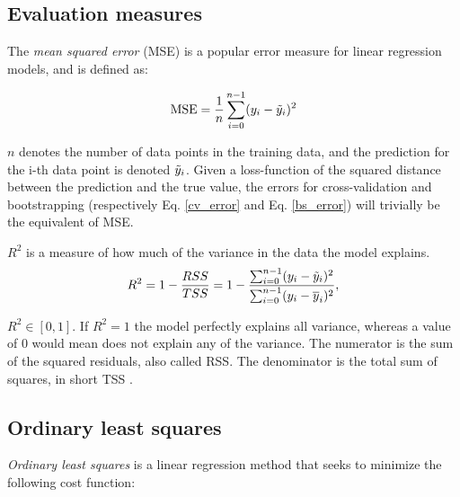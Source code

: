 

\subsection{Evaluation measures}

The \emph{mean squared error} (MSE) is a popular error measure for linear regression models, and is defined as: 

\begin{equation}\label{mse}
    \text{MSE} = \frac{1}{n}\sum_{i=0}^{n-1}(y_i-\Tilde{y}_i)^2
\end{equation}

$n$ denotes the number of data points in the training data, and the prediction for the i-th data point is denoted $\Tilde{y}_i$. Given a loss-function of the squared distance between the prediction and the true value, the errors for cross-validation and bootstrapping (respectively Eq. \ref{cv_error} and Eq. \ref{bs_error}) will trivially be the equivalent of MSE. 

$R^2$ is a measure of how much of the variance in the data the model explains. %
\begin{equation}
    R^2 = 1 - \frac{RSS}{TSS}= 1 - \frac{\sum_{i=0}^{n-1}(y_i-\Tilde{y}_i)^2}{\sum_{i=0}^{n-1}(y_i-\overline{y}_i)^2},
\end{equation}

$R^2 \in [0,1]$. If $R^2 = 1$ the model perfectly explains all variance, whereas a value of 0 would mean does not explain any of the variance. The numerator is the sum of the squared residuals, also called RSS. The denominator is the total sum of squares, in short TSS \cite[p. 29]{martin}.

\subsection{Ordinary least squares}

\textit{Ordinary least squares} is a linear regression method that seeks to minimize the following cost function:

